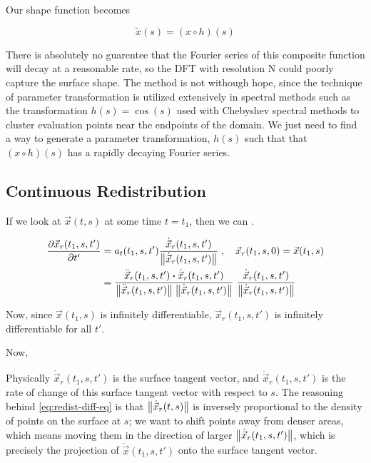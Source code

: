 Our shape function becomes

\[ \tilde{x}(s) = (x \circ h)(s) \]

There is absolutely no guarentee that the Fourier series of this composite function will decay at a reasonable rate, so the DFT with resolution N could poorly capture the surface shape. The method is not withough hope, since the technique of parameter transformation is utilized extensively in spectral methods such as the transformation $h(s) = \cos(s)$ used with Chebyshev spectral methods to cluster evaluation points near the endpoints of the domain. We just need to find a way to generate a parameter transformation, $h(s)$ such that that $(x \circ h)(s)$ has a rapidly decaying Fourier series.

\subsection*{Continuous Redistribution}

If we look at $\vec{x}(t, s)$ at some time $t = t_1$, then we can .

\begin{align}
  \frac{\partial \vec{x}_{r}(t_1, s, t')}{\partial t'}& = a_t(t_1, s, t') \frac{\dot{\vec{x}}_r(t_1, s, t')}{\norm{\dot{\vec{x}}_r(t_1, s, t')}} \; , \quad \vec{x}_r(t_1, s, 0) = \vec{x}(t_1, s)  \notag \\
  &= \frac{\ddot{\vec{x}}_r(t_1, s, t') \boldsymbol{\cdot} \dot{\vec{x}}_r(t_1, s, t')}{\norm{\ddot{\vec{x}}_r(t_1, s, t')} \; \norm{\dot{\vec{x}}_r(t_1, s, t')}} \; \frac{\dot{\vec{x}}_r(t_1, s, t')}{\norm{\dot{\vec{x}}_r(t_1, s, t')}} \label{eq:redist-diff-eq}
\end{align}

Now, since $\vec{x}(t_1, s)$ is infinitely differentiable, $\vec{x}_r(t_1, s, t')$ is infinitely differentiable for all $t'$. 

Now, 

Physically $\dot{\vec{x}}_r(t_1, s, t')$ is the surface tangent vector, and $\ddot{\vec{x}}_r(t_1, s, t')$ is the rate of change of this surface tangent vector with respect to $s$. The reasoning behind \ref{eq:redist-diff-eq} is that $\norm{\dot{\vec{x}}_r(t, s)}$ is inversely proportional to the density of points on the surface at $s$; we want to shift points away from denser areas, which means moving them in the direction of larger $\norm{\dot{\vec{x}}_r(t_1, s, t')}$, which is precisely the projection of $\ddot{\vec{x}}(t_1, s, t')$ onto the surface tangent vector. 

